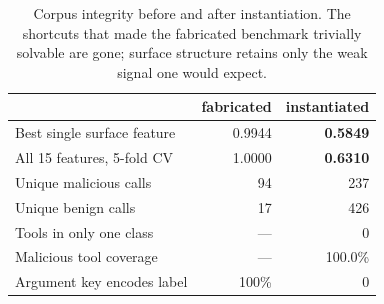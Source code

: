 \begin{table}[!htbp]
\centering\small
\caption{Corpus integrity before and after instantiation. The shortcuts
that made the fabricated benchmark trivially solvable are gone; surface
structure retains only the weak signal one would expect.}
\label{tab:integrity}
\begin{tabular}{lrr}
\toprule
 & fabricated & instantiated \\
\midrule
Best single surface feature  & 0.9944 & \textbf{0.5849} \\
All 15 features, 5-fold CV   & 1.0000 & \textbf{0.6310} \\
\midrule
Unique malicious calls       &     94 &    237 \\
Unique benign calls          &     17 &    426 \\
Tools in only one class      &      — &      0 \\
Malicious tool coverage      &      — & 100.0\% \\
Argument key encodes label   &   100\% &      0 \\
\bottomrule
\end{tabular}
\end{table}
